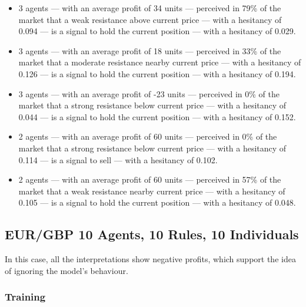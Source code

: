 {\small
  \begin{itemize}
  \item 3 agents — with an average profit of 34 units — perceived in 79\% of the
    market that a weak resistance above current price — with a hesitancy of
    0.094 — is a signal to hold the current position — with a hesitancy of
    0.029.
  \item 3 agents — with an average profit of 18 units — perceived in 33\% of the
    market that a moderate resistance nearby current price — with a hesitancy of
    0.126 — is a signal to hold the current position — with a hesitancy of
    0.194.
  \item 3 agents — with an average profit of -23 units — perceived in 0\% of the
    market that a strong resistance below current price — with a hesitancy of
    0.044 — is a signal to hold the current position — with a hesitancy of
    0.152.
  \item 2 agents — with an average profit of 60 units — perceived in 0\% of the
    market that a strong resistance below current price — with a hesitancy of
    0.114 — is a signal to sell — with a hesitancy of 0.102.
  \item 2 agents — with an average profit of 60 units — perceived in 57\% of the
    market that a weak resistance nearby current price — with a hesitancy of
    0.105 — is a signal to hold the current position — with a hesitancy of
    0.048.
  \end{itemize}
}

\subsection{EUR/GBP 10 Agents, 10 Rules, 10 Individuals}
\label{results:interpretation-eur-gbp-10agents-10rules-10individuals}

In this case, all the interpretations show negative profits, which support the idea of ignoring the model's behaviour.

\subsubsection{Training}

